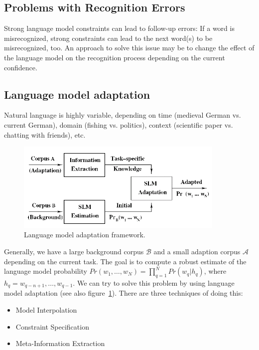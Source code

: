 \subsection{Problems with Recognition Errors}
Strong language model constraints can lead to follow-up errors: If a word is misrecognized, strong constraints can lead to the next word(s) to be misrecognized, too.
An approach to solve this issue may be to change the effect of the language model on the recognition process depending on the current confidence.


\subsection{Language model adaptation}
Natural language is highly variable, depending on time (medieval German vs. current German), domain (fishing vs. politics), context (scientific paper vs. chatting with friends), etc.

\begin{figure}[htb]
\centering
\includegraphics[width=10cm]{images/lmaf.png}
\caption{\label{fig:lmAdaptationFramework} Language model adaptation framework.}
\end{figure}

Generally, we have a large background corpus $\mathcal{B}$ and a small adaption corpus $\mathcal{A}$ depending on the current task. The goal is to compute a robust estimate of the language model probability $Pr(w_1,\dots,w_N) = \prod_{q=1}^{N} Pr(w_q | h_q)$, where $h_q = w_{q-n+1}, \dots, w_{q-1}$. We can try to solve this problem by using language model adaptation (see also figure~\ref{fig:lmAdaptationFramework}). There are three techniques of doing this:
\begin{itemize}
    \item Model Interpolation
    \item Constraint Specification
    \item Meta-Information Extraction
\end{itemize}

